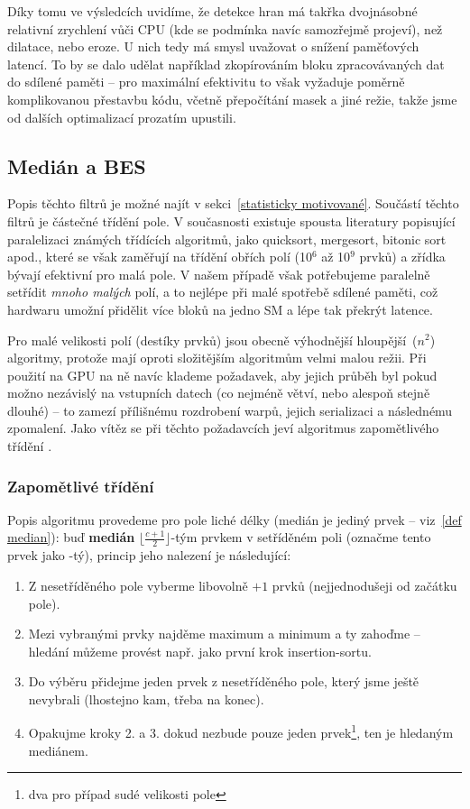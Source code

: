     Díky tomu ve výsledcích uvidíme, že detekce hran má takřka dvojnásobné relativní zrychlení vůči CPU (kde se podmínka navíc samozřejmě projeví), než dilatace, nebo eroze. U nich tedy má smysl uvažovat o snížení paměťových latencí. To by se dalo udělat například zkopírováním bloku zpracovávaných dat do sdílené paměti -- pro maximální efektivitu to však vyžaduje poměrně komplikovanou přestavbu kódu, včetně přepočítání masek a jiné režie, takže jsme od dalších optimalizací prozatím upustili.

    \subsection{Medián a BES}

    Popis těchto filtrů je možné najít v sekci~\ref{statisticky motivované}. Součástí těchto filtrů je částečné třídění pole. V současnosti existuje spousta literatury popisující paralelizaci známých třídících algoritmů, jako quicksort, mergesort, bitonic sort apod., které se však zaměřují na třídění obřích polí (10$^6$ až 10$^9$ prvků) a zřídka bývají efektivní pro malá pole. V našem případě však potřebujeme paralelně setřídit \emph{mnoho malých} polí, a to nejlépe při malé spotřebě sdílené paměti, což hardwaru umožní přidělit více bloků na jedno SM a lépe tak překrýt latence.

    Pro malé velikosti polí (destíky prvků) jsou obecně výhodnější \bq hloupější\eq ~\OOO($n^2$) algoritmy, protože mají oproti složitějším algoritmům velmi malou režii. Při použití na GPU na ně navíc klademe požadavek, aby jejich průběh byl pokud možno nezávislý na vstupních datech (co nejméně větví, nebo alespoň stejně dlouhé) -- to zamezí přílišnému rozdrobení warpů, jejich serializaci a následnému zpomalení. Jako vítěz se při těchto požadavcích jeví algoritmus zapomětlivého třídění \cite{Forgetful}.

        \subsubsection{Zapomětlivé třídění}

        Popis algoritmu provedeme pro pole liché délky (medián je jediný prvek -- viz~\ref{def median}):
        buď \textbf{medián} $\lfloor \frac{c+1}{2} \rfloor$-tým prvkem v setříděném poli (označme tento prvek jako \kk-tý), princip jeho nalezení je následující:
        \begin{enumerate}
          \item Z nesetříděného pole vyberme libovolně \kk$+1$ prvků (nejjednodušeji od začátku pole).
          \item Mezi vybranými prvky najděme maximum a minimum a ty zahoďme -- hledání můžeme provést např. jako první krok insertion-sortu.
          \item Do výběru přidejme jeden prvek z nesetříděného pole, který jsme ještě nevybrali (lhostejno kam, třeba na konec).
          \item Opakujme kroky 2. a 3. dokud nezbude pouze jeden prvek\footnote{dva pro případ sudé velikosti pole}, ten je hledaným mediánem.
        \end{enumerate}
    
